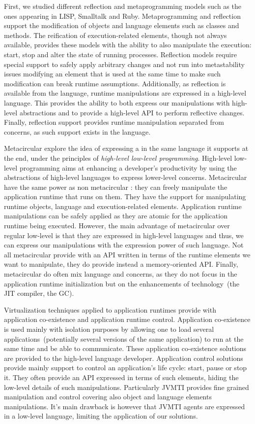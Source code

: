 First, we studied different reflection and metaprogramming models such as the ones appearing in LISP, Smalltalk and Ruby. Metaprogramming and reflection support the modification of objects and language elements such as classes and methods. The reification of execution-related elements, though not always available, provides these models with the ability to also manipulate the execution: start, stop and alter the state of running processes. Reflection models require special support to safely apply arbitrary changes and not run into metastability issues \ie modifying an element that is used at the same time to make such modification can break runtime assumptions. Additionally, as reflection is available from the language, runtime manipulations are expressed in a high-level language. This provides the ability to both express our manipulations with high-level abstractions and to provide a high-level API to perform reflective changes. Finally, reflection support provides runtime manipulation separated from \VM concerns, as such support exists in the language.

Metacircular \VMs explore the idea of expressing a \VM in the same language it supports at the end, under the principles of \emph{high-level low-level programming}. High-level low-level programming aims at enhancing a developer's productivity by using the abstractions of high-level languages to express lower-level concerns. Metacircular \VMs have the same power as non metacircular \VMs: they can freely manipulate the application runtime that runs on them. They have the support for manipulating runtime objects, language and execution-related elements. Application runtime manipulations can be safely applied as they are atomic for the application runtime being executed. However, the main advantage of metacircular \VMs over regular low-level \VMs is that they are expressed in high-level languages and thus, we can express our manipulations with the expression power of such language. Not all metacircular \VMs provide with an API written in terms of the runtime elements we want to manipulate, they do provide instead a memory-oriented API. Finally, metacircular \VMs do often mix language and \VM concerns, as they do not focus in the application runtime initialization but on the enhancements of \VM technology~(\eg the JIT compiler, the GC).

Virtualization techniques applied to application runtimes provide with application co-existence and application runtime control. Application co-existence is used mainly with isolation purposes by allowing one to load several applications~(potentially several versions of the same application) to run at the same time and be able to communicate. These application co-existence solutions are provided to the high-level language developer. Application control solutions provide mainly support to control an application's life cycle: start, pause or stop it. They often provide an API expressed in terms of such elements, hiding the low-level details of such manipulations. Particularly JVMTI provides fine grained manipulation and control covering also object and language elements manipulations. It's main drawback is however that JVMTI agents are expressed in a low-level language, limiting the application of our solutions.

